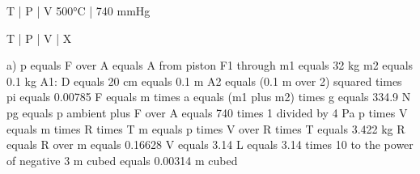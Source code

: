 T | P | V
500°C | 740 mmHg

T | P | V | X

a)
p equals F over A equals A from piston
F1 through m1 equals 32 kg
m2 equals 0.1 kg
A1:
D equals 20 cm equals 0.1 m
A2 equals (0.1 m over 2) squared times pi equals 0.00785
F equals m times a equals (m1 plus m2) times g equals 334.9 N
pg equals p ambient plus F over A equals 740 times 1 divided by 4 Pa
p times V equals m times R times T
m equals p times V over R times T equals 3.422 kg
R equals R over m equals 0.16628
V equals 3.14 L equals 3.14 times 10 to the power of negative 3 m cubed equals 0.00314 m cubed